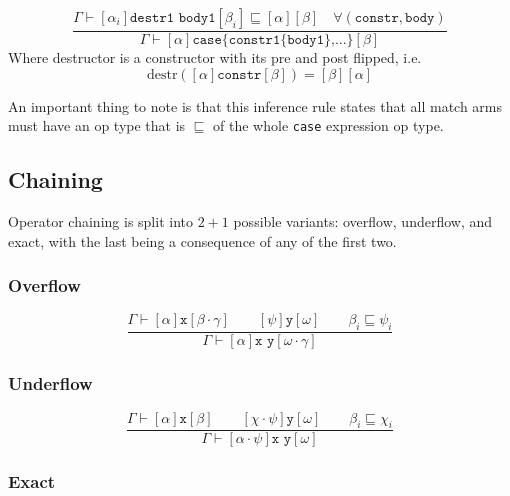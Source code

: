 \documentclass{article}
\newcommand{\op}[3]{[#1] \texttt{#2} [#3]}
\begin{document}
\begin{equation*}
  \tag{Case}
  \frac{
    \Gamma \vdash
    \op{\alpha_i}{destr1 body1}{\beta_i} \sqsubseteq \op{\alpha}{}{\beta} \quad \forall (\texttt{constr}, \texttt{body})
  }{
    \Gamma \vdash
    \op{\alpha}{case\{constr1\{body1\},...\}}{\beta}
  }
\end{equation*}
Where destructor is a constructor with its pre and post flipped, i.e.
\begin{equation*}
  \text{destr}(\op{\alpha}{constr}{\beta}) = \op{\beta}{}{\alpha}
\end{equation*}

An important thing to note is that this inference rule states that all
match arms must have an op type that is $\sqsubseteq$ of the whole
\texttt{case} expression op type.

\subsection*{Chaining}
Operator chaining is split into $2+1$ possible variants: overflow,
underflow, and exact, with the last being a consequence of any of the
first two.

\subsubsection*{Overflow}

\begin{equation*}
  \tag{Overflow}
  \frac{
    \Gamma \vdash
    \op{\alpha}{x}{\beta \cdot \gamma} \qquad
    \op{\psi}{y}{\omega} \qquad
    \beta_i \sqsubseteq \psi_i
  }{
    \Gamma \vdash \op{\alpha}{x y}{\omega \cdot \gamma}
  }
\end{equation*}

\subsubsection*{Underflow}

\begin{equation*}
  \tag{Underflow}
  \frac{
    \Gamma \vdash
    \op{\alpha}{x}{\beta} \qquad
    \op{\chi \cdot \psi}{y}{\omega} \qquad
    \beta_i \sqsubseteq \chi_i
  }{
    \Gamma \vdash \op{\alpha \cdot \psi}{x y}{\omega}
  }
\end{equation*}

\subsubsection*{Exact}
\end{document}
